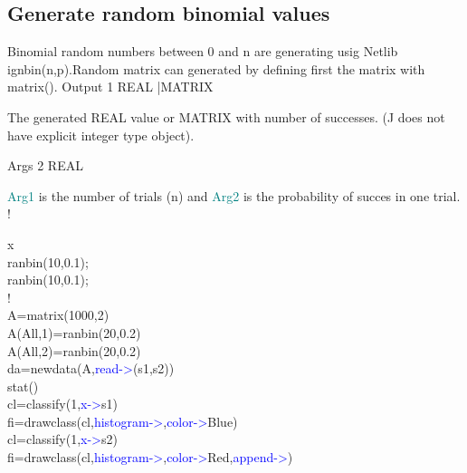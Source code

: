 \subsection{Generate random binomial values}
\label{ranbin}
Binomial random numbers between 0 and n are generating usig Netlib
ignbin(n,p).Random matrix can generated by defining first
the matrix with \textcolor{VioletRed}{matrix}().
\vspace{0.3cm}
\hline
\vspace{0.3cm}
\noindent Output \tabto{3cm}  1 \tabto{5cm}   REAL |MATRIX   \tabto{7cm}
\begin{changemargin}{3cm}{0cm}
\noindent  The generated REAL value or MATRIX with
number of successes. (J does not have explicit integer type object).
\end{changemargin}
\vspace{0.3cm}
\hline
\vspace{0.3cm}
\noindent Args  \tabto{3cm} 2 \tabto{5cm}  REAL \tabto{7cm}
\begin{changemargin}{3cm}{0cm}
\noindent  \textcolor{teal}{Arg1} is the number of trials (n) and \textcolor{teal}{Arg2} is the probability
of succes in one trial.
!
\end {changemargin}
\hline
\vspace{0.2cm}
\begin{example}[ranbinex]x\\
\label{ranbinex}
\textcolor{VioletRed}{ranbin}(10,0.1);\\
\textcolor{VioletRed}{ranbin}(10,0.1);\\
!\\
A=\textcolor{VioletRed}{matrix}(1000,2)\\
A(All,1)=\textcolor{VioletRed}{ranbin}(20,0.2)\\
A(All,2)=\textcolor{VioletRed}{ranbin}(20,0.2)\\
da=\textcolor{VioletRed}{newdata}(A,\textcolor{blue}{read->}(s1,s2))\\
\textcolor{VioletRed}{stat}()\\
cl=\textcolor{VioletRed}{classify}(1,\textcolor{blue}{x->}s1)\\
fi=\textcolor{VioletRed}{drawclass}(cl,\textcolor{blue}{histogram->},\textcolor{blue}{color->}Blue)\\
cl=\textcolor{VioletRed}{classify}(1,\textcolor{blue}{x->}s2)\\
fi=\textcolor{VioletRed}{drawclass}(cl,\textcolor{blue}{histogram->},\textcolor{blue}{color->}Red,\textcolor{blue}{append->})
\end{example}
